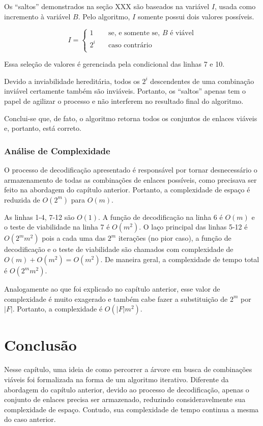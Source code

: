 Os “saltos” demonstrados na seção XXX são baseados na variável $I$, usada como incremento à variável $B$. Pelo algoritmo, $I$ somente possui dois valores possíveis. 

\[ I =
\begin{cases}
	1	& \quad	\text{se, e somente se, } B \text{ é viável} \\
	2^i	& \quad	\text{caso contrário} \\
  \end{cases}
\]

Essa seleção de valores é gerenciada pela condicional das linhas 7 e 10.

Devido a inviabilidade hereditária, todos os $2^i$ descendentes de uma combinação inviável certamente também são inviáveis. Portanto, os “saltos” apenas tem o papel de agilizar o processo e não interferem no resultado final do algoritmo.

Conclui-se que, de fato, o algoritmo retorna todos os conjuntos de enlaces viáveis e, portanto, está correto.

\subsubsection{Análise de Complexidade}

O processo de decodificação apresentado é responsável por tornar desnecessário o armazenamento de todas as combinações de enlaces possíveis, como precisava ser feito na abordagem do capítulo anterior. Portanto, a complexidade de espaço é reduzida de $O(2^m)$ para $O(m)$.

	As linhas 1-4, 7-12 são $O(1)$. A função de decodificação na linha 6 é $O(m)$ e o teste de viabilidade na linha 7 é $O(m^2)$. O laço principal das linhas 5-12 é $O(2^mm^2)$ pois a cada uma das $2^m$ iterações (no pior caso), a função de decodificação e o teste de viabilidade são chamados com complexidade de $O(m) + O(m^2) = O(m^2)$. De maneira geral, a complexidade de tempo total é  $O(2^mm^2)$. 

Analogamente ao que foi explicado no capítulo anterior, esse valor de complexidade é muito exagerado e também cabe fazer a substituição de $2^m$ por $|F|$. Portanto, a complexidade é $O(|F|m^2)$.

\section{Conclusão}

Nesse capítulo, uma ideia de como percorrer a árvore em busca de combinações viáveis foi formalizada na forma de um algoritmo iterativo. Diferente da abordagem do capítulo anterior, devido ao processo de decodificação, apenas o conjunto de enlaces precisa ser armazenado, reduzindo consideravelmente sua complexidade de espaço. Contudo, sua complexidade de tempo continua a mesma do caso anterior.
